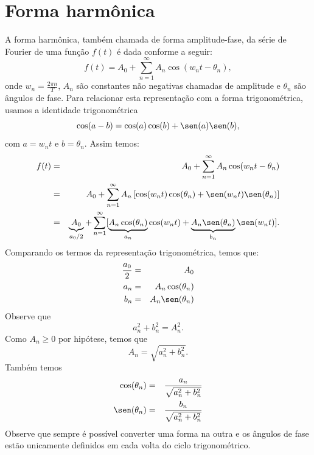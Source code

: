 \section{Forma harmônica}
A forma harmônica, também chamada de forma amplitude-fase, da série de Fourier de uma função $f(t)$ é dada conforme a seguir:
\begin{equation}
f(t)=A_0+\sum_{n=1}^\infty A_n\cos(w_n t-\theta_n),
\end{equation}
onde $w_n=\frac{2\pi n}{T}$, $A_n$ são constantes não negativas chamadas de amplitude e $\theta_n$ são ângulos de fase. Para relacionar esta representação com a forma trigonométrica, usamos a identidade trigonométrica
\begin{equation}
\cos(a-b)=\cos(a)\cos(b)+\sen(a)\sen(b),
\end{equation}
com $a=w_n t$ e $b=\theta_n$. Assim temos:
\begin{eqnarray*}
f(t)&=&A_0+\sum_{n=1}^\infty A_n\cos(w_n t-\theta_n)\\
&=&A_0+\sum_{n=1}^\infty A_n\left[\cos(w_n t)\cos(\theta_n)+\sen(w_n t)\sen(\theta_n)\right]\\
&=&\underbrace{A_0}_{a_0/2}+\sum_{n=1}^\infty[ \underbrace{A_n\cos(\theta_n)}_{a_n} \cos(w_n t)+\underbrace{A_n\sen(\theta_n)}_{b_n}\sen(w_n t)].
\end{eqnarray*}
Comparando os termos da representação trigonométrica, temos que:
\begin{eqnarray*}
\frac{a_0}{2}&=&A_0\\
a_n&=&A_n\cos(\theta_n)\\
b_n&=&A_n\sen(\theta_n)\\
\end{eqnarray*}
Observe que
\begin{equation}
a_n^2+b_n^2=A_n^2.
\end{equation}
Como $A_n\geq 0$ por hipótese, temos que 
\begin{equation}
A_n=\sqrt{a_n^2+b_n^2}.
\end{equation}
Também temos
\begin{eqnarray*}
\cos(\theta_n)&=&\frac{a_n}{\sqrt{a_n^2+b_n^2}}\\
\sen(\theta_n)&=&\frac{b_n}{\sqrt{a_n^2+b_n^2}}
\end{eqnarray*}
Observe que sempre é possível converter uma forma na outra e os ângulos de fase estão unicamente definidos em cada volta do ciclo trigonométrico.
